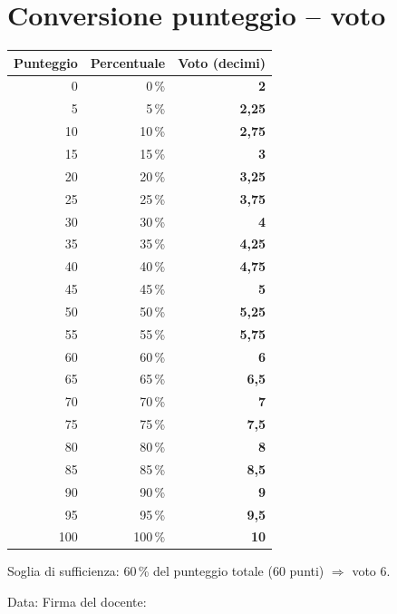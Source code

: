 \documentclass[11pt,a4paper]{article}
\begin{document}
\section*{Conversione punteggio -- voto}
\begin{center}
\small
\begin{longtable}{@{}rrr@{}}
\toprule
\textbf{Punteggio} & \textbf{Percentuale} & \textbf{Voto (decimi)} \\
\midrule
\endhead


0 & 0\,\% & \textbf{2} \\


5 & 5\,\% & \textbf{2,25} \\


10 & 10\,\% & \textbf{2,75} \\


15 & 15\,\% & \textbf{3} \\


20 & 20\,\% & \textbf{3,25} \\


25 & 25\,\% & \textbf{3,75} \\


30 & 30\,\% & \textbf{4} \\


35 & 35\,\% & \textbf{4,25} \\


40 & 40\,\% & \textbf{4,75} \\


45 & 45\,\% & \textbf{5} \\


50 & 50\,\% & \textbf{5,25} \\


55 & 55\,\% & \textbf{5,75} \\

\midrule
60 & 60\,\% & \textbf{6} \\


65 & 65\,\% & \textbf{6,5} \\


70 & 70\,\% & \textbf{7} \\


75 & 75\,\% & \textbf{7,5} \\


80 & 80\,\% & \textbf{8} \\


85 & 85\,\% & \textbf{8,5} \\


90 & 90\,\% & \textbf{9} \\


95 & 95\,\% & \textbf{9,5} \\


100 & 100\,\% & \textbf{10} \\

\bottomrule
\end{longtable}
\end{center}
\noindent\small Soglia di sufficienza: 60\,\% del punteggio totale (60 punti) $\Rightarrow$ voto 6.

\vspace{8mm}
\noindent Data: \dotfill \hfill Firma del docente: \dotfill
\end{document}
